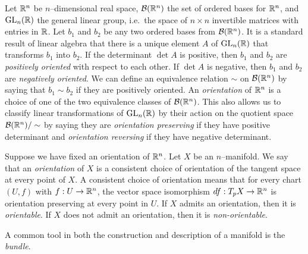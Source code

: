 \begin{defn}[Orientation]
	\label{def:orientation}
	Let $\mathbb{R}^n$ be $n$--dimensional real space, $\mathcal{B}(\mathbb{R}^n)$ the set of ordered bases for $\mathbb{R}^n$, and $\textrm{GL}_{n}(\mathbb{R})$ the general linear group, i.e.\ the space of $n\times n$ invertible matrices with entries in $\mathbb{R}$.
	Let $b_1$ and $b_2$ be any two ordered bases from $\mathcal{B}(\mathbb{R}^n)$.
	It is a standard result of linear algebra that there is a unique element $A$ of $\textrm{GL}_{n}(\mathbb{R})$ that transforms $b_1$ into $b_2$.
	If the determinant $\det A$ is positive, then $b_1$ and $b_2$ are \emph{positively oriented} with respect to each other.
	If $\det A$ is negative, then $b_1$ and $b_2$ are \emph{negatively oriented}.
	We can define an equivalence relation $\sim$ on $\mathcal{B}(\mathbb{R}^n)$ by saying that $b_1\sim b_2$ if they are positively oriented.
	An \emph{orientation} of $\mathbb{R}^n$ is a choice of one of the two equivalence classes of $\mathcal{B}(\mathbb{R}^n)$.
	This also allows us to classify linear transformations of $\textrm{GL}_{n}(\mathbb{R})$ by their action on the quotient space $\mathcal{B}(\mathbb{R}^n)/\sim$ by saying they are \emph{orientation preserving} if they have positive determinant and \emph{orientation reversing} if they have negative determinant.
	
	Suppose we have fixed an orientation of $\mathbb{R}^n$.
	Let $X$ be an $n$--manifold.
	We say that an \emph{orientation} of $X$ is a consistent choice of orientation of the tangent space at every point of $X$.
	A consistent choice of orientation means that for every chart $(U,f)$ with $f:U\to\mathbb{R}^n$, the vector space isomorphism $df:T_p X\to \mathbb{R}^n$ is orientation preserving at every point in $U$. 
	If $X$ admits an orientation, then it is \emph{orientable}.
	If $X$ does not admit an orientation, then it is \emph{non-orientable}.
\end{defn}

A common tool in both the construction and description of a manifold is the \emph{bundle}.

